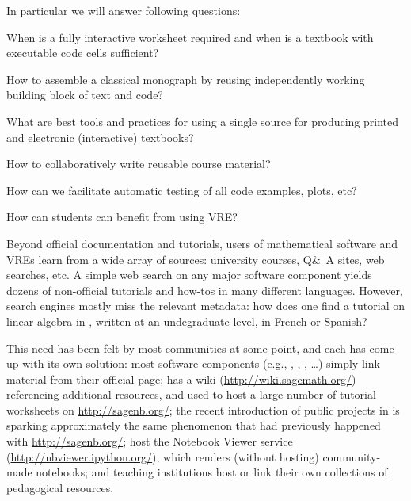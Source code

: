 \begin{workpackage}
\begin{tasklist}
\begin{task}[title=Introduce \TheProject to Researchers and Teachers, id=project-intro,lead=USH,PM=14]
\begin{task}[title=Demonstrator: Interactive books,
id=ibook,lead=US,PM=30]
In particular we will answer following questions:

\begin{compactitem}
\item When is a fully interactive worksheet required and when is
  a textbook with executable code cells sufficient?
\item How to assemble a classical monograph by reusing independently working
  building block of text and code?
\item What are best tools and practices for using a single source for
  producing printed and electronic (interactive) textbooks?
\item How to collaboratively write reusable course material?
\item How can we facilitate automatic testing of all code examples, plots, etc?
\item How can students can benefit from using VRE?
\end{compactitem}


\end{task}

\begin{task}[title=Demonstrator: Computational mathematics resources indexing service,
id=index-librorum-salvificorum,lead=UV,PM=2,partners={UB}] Beyond official documentation and
  tutorials, users of mathematical software and VREs learn from a wide
  array of sources: university courses, Q\&\ A sites, web searches,
  etc.  A simple web search on any major software component yields
  dozens of non-official tutorials and how-tos in many different
  languages. However, search engines mostly miss the relevant
  metadata: how does one find a tutorial on linear algebra in \PariGP,
  written at an undegraduate level, in French or Spanish?

This need has been felt by most communities at some point, and each
has come up with its own solution: most software components (e.g.,
\GAP, \PariGP, \Sage, \dots) simply link material from their official
page; \Sage has a wiki (\url{http://wiki.sagemath.org/}) referencing
additional resources, and used to host a large number of tutorial
worksheets on \url{http://sagenb.org/}; the recent introduction of
public projects in \SMC is sparking approximately the same phenomenon
that had previously happened with \url{http://sagenb.org/}; \IPython
host the Notebook Viewer service (\url{http://nbviewer.ipython.org/}),
which renders (without hosting) community-made notebooks; and teaching
institutions host or link their own collections of pedagogical
resources.


\end{task}
\end{task}
\end{tasklist}
\end{workpackage}

